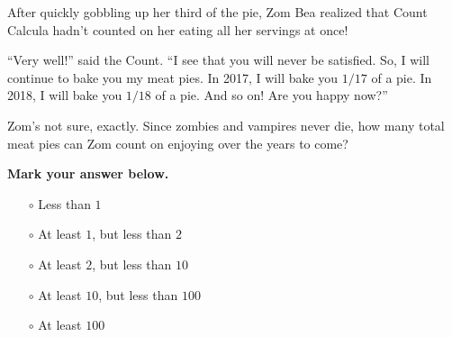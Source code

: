 


After quickly gobbling up her third of the pie, Zom Bea realized that Count
Calcula hadn't counted on her eating all her servings at once!

``Very well!'' said the Count. ``I see that you will never be satisfied.
So, I will continue to bake you my meat pies. In 2017, I will bake you
\(1/17\) of a pie. In 2018, I will bake you \(1/18\) of a pie. And so on!
Are you happy now?''

Zom's not sure, exactly. Since zombies and vampires never die, how many
total meat pies can Zom count on enjoying over the years to come?

\vspace{1em}

\textbf{Mark your answer below.}

\begin{itemize}
  \item[\Huge\(\circ\)] Less than \(1\)
  \item[\Huge\(\circ\)] At least \(1\), but less than \(2\)
  \item[\Huge\(\circ\)] At least \(2\), but less than \(10\)
  \item[\Huge\(\circ\)] At least \(10\), but less than \(100\)
  \item[\Huge\(\circ\)] At least \(100\)
\end{itemize}
